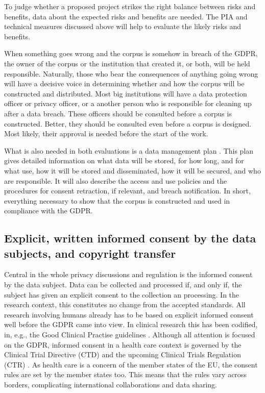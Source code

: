 \documentclass[10pt, a4paper]{article}
\begin{document}
To judge whether a proposed project strikes the right balance between risks and benefits, data about the expected risks and benefits are needed. The PIA and technical measures discussed above will help to evaluate the likely risks and benefits. 

When something goes wrong and the corpus is somehow in breach of the GDPR, the owner of the corpus or the institution that created it, or both, will be held responsible. Naturally, those who bear the consequences of anything going wrong will have a decisive voice in determining whether and how the corpus will be constructed and distributed. Most big institutions will have a data protection officer or privacy officer, or a another person who is responsible for cleaning up after a data breach. These officers should be consulted before a corpus is constructed. Better, they should be consulted even before a corpus is designed. Most likely, their approval is needed before the start of the work.

What is also needed in both evaluations is a data management plan \cite{AcademyFinland20DMP}. This plan gives detailed information on what data will be stored, for how long, and for what use, how it will be stored and disseminated, how it will be secured, and who are responsible. It will also describe the access and use policies and the procedures for consent retraction, if relevant, and breach notification. In short, everything necessary to show that the corpus is constructed and used in compliance with the GDPR.

\subsection{Explicit, written informed consent by the data subjects, and copyright transfer}

Central in the whole privacy discussions and regulation is the informed consent by the data subject. Data can be collected and processed if, and only if, the subject has given an explicit consent to the collection an processing. In the research context, this constitutes no change from the accepted standards. All research involving humans already has to be based on explicit informed consent well before the GDPR came into view. In clinical research this has been codified, in, e.g., the Good Clinical Practise guidelines \cite{ICH1996GCP}. Although all attention is focused on the GDPR, informed consent in a health care context is governed by the Clinical Trial Directive (CTD) and the upcoming Clinical Trials Regulation (CTR) \cite{dittrich2015esmod,EU2014CTR}. As health care is a concern of the member states of the EU, the consent rules are set by the member states too. This means that the rules vary across borders, complicating international collaborations and data sharing.
\end{document}
